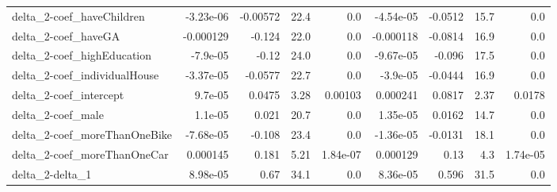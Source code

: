 \begin{tabular}{lrrrrrrrr}
delta_2-coef_haveChildren & -3.23e-06 & -0.00572 & 22.4 & 0.0 & -4.54e-05 & -0.0512 & 15.7 & 0.0 \\
delta_2-coef_haveGA & -0.000129 & -0.124 & 22.0 & 0.0 & -0.000118 & -0.0814 & 16.9 & 0.0 \\
delta_2-coef_highEducation & -7.9e-05 & -0.12 & 24.0 & 0.0 & -9.67e-05 & -0.096 & 17.5 & 0.0 \\
delta_2-coef_individualHouse & -3.37e-05 & -0.0577 & 22.7 & 0.0 & -3.9e-05 & -0.0444 & 16.9 & 0.0 \\
delta_2-coef_intercept & 9.7e-05 & 0.0475 & 3.28 & 0.00103 & 0.000241 & 0.0817 & 2.37 & 0.0178 \\
delta_2-coef_male & 1.1e-05 & 0.021 & 20.7 & 0.0 & 1.35e-05 & 0.0162 & 14.7 & 0.0 \\
delta_2-coef_moreThanOneBike & -7.68e-05 & -0.108 & 23.4 & 0.0 & -1.36e-05 & -0.0131 & 18.1 & 0.0 \\
delta_2-coef_moreThanOneCar & 0.000145 & 0.181 & 5.21 & 1.84e-07 & 0.000129 & 0.13 & 4.3 & 1.74e-05 \\
delta_2-delta_1 & 8.98e-05 & 0.67 & 34.1 & 0.0 & 8.36e-05 & 0.596 & 31.5 & 0.0 \\
\end{tabular}
